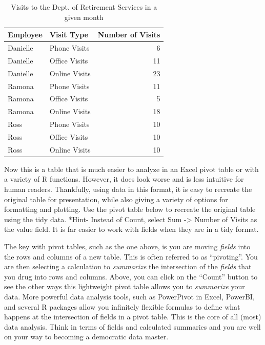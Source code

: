 \documentclass[]{book}
\newenvironment{Shaded}{\begin{snugshade}}{\end{snugshade}}
\newcommand{\DataTypeTok}[1]{\textcolor[rgb]{0.13,0.29,0.53}{#1}}
\newcommand{\KeywordTok}[1]{\textcolor[rgb]{0.13,0.29,0.53}{\textbf{#1}}}
\newcommand{\NormalTok}[1]{#1}
\newcommand{\OperatorTok}[1]{\textcolor[rgb]{0.81,0.36,0.00}{\textbf{#1}}}
\newcommand{\StringTok}[1]{\textcolor[rgb]{0.31,0.60,0.02}{#1}}
\begin{document}
\begin{table}

\caption{\label{tab:unnamed-chunk-9}Visits to the Dept. of Retirement Services in a given month}
\centering
\begin{tabular}[t]{l|l|r}
\hline
Employee & Visit Type & Number of Visits\\
\hline
Danielle & Phone Visits & 6\\
\hline
Danielle & Office Visits & 11\\
\hline
Danielle & Online Visits & 23\\
\hline
Ramona & Phone Visits & 11\\
\hline
Ramona & Office Visits & 5\\
\hline
Ramona & Online Visits & 18\\
\hline
Ross & Phone Visits & 10\\
\hline
Ross & Office Visits & 10\\
\hline
Ross & Online Visits & 10\\
\hline
\end{tabular}
\end{table}

Now this is a table that is much easier to analyze in an Excel pivot table or with a variety of R functions. However, it does look worse and is less intuitive for human readers. Thankfully, using data in this format, it is easy to recreate the original table for presentation, while also giving a variety of options for formatting and plotting. Use the pivot table below to recreate the original table using the tidy data. *Hint- Instead of Count, select Sum -\textgreater{} Number of Visits as the value field. It is far easier to work with fields when they are in a tidy format.

\begin{Shaded}
\end{Shaded}

\hypertarget{htmlwidget-a2d8a69d84581603af12}{}

The key with pivot tables, such as the one above, is you are moving \emph{fields} into the rows and columns of a new table. This is often referred to as ``pivoting''. You are then selecting a calculation to \emph{summarize} the intersection of the \emph{fields} that you drug into rows and columns. Above, you can click on the ``Count'' button to see the other ways this lightweight pivot table allows you to \emph{summarize} your data. More powerful data analysis tools, such as PowerPivot in Excel, PowerBI, and several R packages allow you infinitely flexible formulas to define what happens at the intersection of fields in a pivot table. This is the core of all (most) data analysis. Think in terms of fields and calculated summaries and you are well on your way to becoming a democratic data master.
\end{document}
